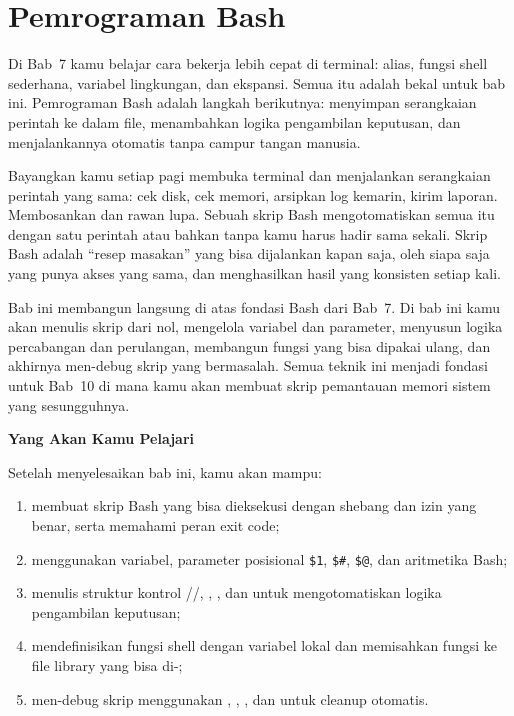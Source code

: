 
\chapter{Pemrograman Bash}
\label{ch:bash-programming}

Di Bab~7 kamu belajar cara bekerja lebih cepat di terminal: alias,
fungsi shell sederhana, variabel lingkungan, dan ekspansi. Semua itu
adalah bekal untuk bab ini. Pemrograman Bash adalah langkah berikutnya:
menyimpan serangkaian perintah ke dalam file, menambahkan logika
pengambilan keputusan, dan menjalankannya otomatis tanpa campur tangan
manusia.

Bayangkan kamu setiap pagi membuka terminal dan menjalankan serangkaian
perintah yang sama: cek disk, cek memori, arsipkan log kemarin, kirim
laporan. Membosankan dan rawan lupa. Sebuah skrip Bash mengotomatiskan
semua itu dengan satu perintah atau bahkan tanpa kamu harus hadir sama
sekali. Skrip Bash adalah ``resep masakan'' yang bisa dijalankan
kapan saja, oleh siapa saja yang punya akses yang sama, dan menghasilkan
hasil yang konsisten setiap kali.

Bab ini membangun langsung di atas fondasi Bash dari Bab~7.
Di bab ini kamu akan menulis skrip dari nol, mengelola variabel dan
parameter, menyusun logika percabangan dan perulangan, membangun fungsi
yang bisa dipakai ulang, dan akhirnya men-debug skrip yang bermasalah.
Semua teknik ini menjadi fondasi untuk Bab~10 di mana kamu akan membuat
skrip pemantauan memori sistem yang sesungguhnya.

\textbf{Yang Akan Kamu Pelajari}

Setelah menyelesaikan bab ini, kamu akan mampu:

\begin{enumerate}
    \item membuat skrip Bash yang bisa dieksekusi dengan shebang dan izin
          yang benar, serta memahami peran exit code;
    \item menggunakan variabel, parameter posisional \texttt{\$1},
          \texttt{\$\#}, \texttt{\$@}, dan aritmetika Bash;
    \item menulis struktur kontrol //,
          , , dan  untuk mengotomatiskan
          logika pengambilan keputusan;
    \item mendefinisikan fungsi shell dengan variabel lokal dan memisahkan
          fungsi ke file library yang bisa di-;
    \item men-debug skrip menggunakan , ,
          , dan  untuk cleanup otomatis.
\end{enumerate}

